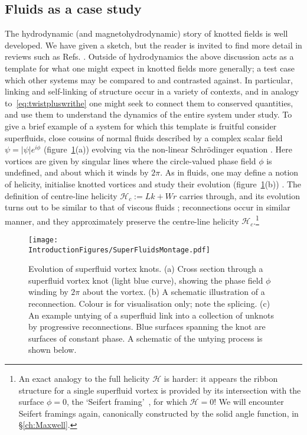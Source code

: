 \subsection{Fluids as a case study}
The hydrodynamic (and magnetohydrodynamic) story of knotted fields is well developed. We have given a sketch, but the reader is invited to find more detail in reviews such as Refs. \citep{Moffatt2014, Irvine2018}. Outside of hydrodynamics the above discussion acts as a template for what one might expect in knotted fields more generally; a test case which other systems may be compared to and contrasted against. In particular, linking and self-linking of structure occur in a variety of contexts, and in analogy to~\eqref{eq:twistpluswrithe} one might seek to connect them to conserved quantities, and use them to understand the dynamics of the entire system under study. To give a brief example of a system for which this template is fruitful consider superfluids, close cousins of normal fluids described by a complex scalar field $\psi = |\psi| e^{i \phi}$ (figure~\ref{fig:SuperFluidMontage}(a)) evolving via the non-linear Schr\"odinger equation \citep{Kleckner2016}. Here vortices are given by singular lines where the circle-valued phase field $\phi$ is undefined, and about which it winds by $2\pi$. As in fluids, one may define a notion of helicity, initialise knotted vortices and study their evolution (figure~\ref{fig:SuperFluidMontage}(b)) \citep{Scheeler2014, Kleckner2016}. The definition of centre-line helicity $\mathcal{H}_c := Lk + Wr$ carries through, and its evolution turns out to be similar to that of viscous fluids \citep{Scheeler2014, Kleckner2016}; reconnections occur in similar manner, and they approximately preserve the centre-line helicity $\mathcal{H}_c$.\footnote{ \label{footnote:Seifert} An exact analogy to the full helicity $\mathcal{H}$ is harder: it appears the ribbon structure for a single superfluid vortex is provided by its intersection with the surface $\phi =0$, the `Seifert framing'~\citep{Winfree1983c,MoffattBook,Salman2016,Salman2017,Kedia2018}, for which $\mathcal{H}=0$! We will encounter Seifert framings again, canonically constructed by the solid angle function, in \S \ref{ch:Maxwell}.}
\begin{figure}[htbp]
\centering
\texttt{[image: \\IntroductionFigures/SuperFluidsMontage.pdf]}
\caption{Evolution of superfluid vortex knots. (a) Cross section through a superfluid vortex knot (light blue curve), showing the phase field $\phi$ winding by $2 \pi$ about the vortex. (b) A schematic illustration of a reconnection. Colour is for visualisation only; note the splicing. (c) An example untying of a superfluid link into a collection of unknots by progressive reconnections. Blue surfaces spanning the knot are surfaces of constant phase. A schematic of the untying process is shown below.}
\label{fig:SuperFluidMontage}
\end{figure}

